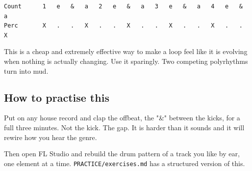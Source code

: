 \begin{verbatim}
Count      1   e   &   a   2   e   &   a   3   e   &   a   4   e   &   a
Perc       X   .   .   X   .   .   X   .   .   X   .   .   X   .   .   X
\end{verbatim}

This is a cheap and extremely effective way to make a loop feel like it is evolving when
nothing is actually changing. Use it sparingly. Two competing polyrhythms turn into mud.

\subsection{How to practise this}\label{th03_rhythm-how-to-practise-this}

Put on any house record and clap the offbeat, the "\&" between the kicks, for a full three
minutes. Not the kick. The gap. It is harder than it sounds and it will rewire how you hear
the genre.

Then open FL Studio and rebuild the drum pattern of a track you like by ear, one element at
a time. \texttt{PRACTICE/exercises.md} has a structured version of this.
